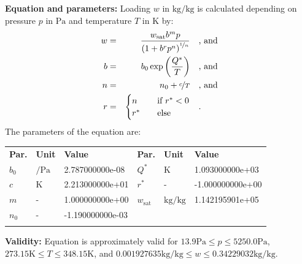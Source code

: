\textbf{Equation and parameters:}
\newline
%
Loading $w$ in $\si{\kilogram\per\kilogram}$ is calculated depending on pressure $p$ in $\si{\pascal}$ and temperature $T$ in $\si{\kelvin}$ by:
%
\begin{equation*}
\begin{split}
w &=& \frac{w_\mathrm{sat} b^{m} p}{\left( 1 + b^{r} p^{n} \right)^{\nicefrac{1}{n}}} & \quad\text{, and} \\
b &=& b_0 \exp\left( \frac{Q^{*}}{T} \right) & \quad\text{, and} \\
n &=& n_0 + \nicefrac{c}{T} & \quad\text{, and} \\
r &=& \begin{cases} n & \quad \text{if } r^{*} < 0 \\ r^{*}  & \quad \text{else} \end{cases} & \quad\text{.}
\end{split}
\end{equation*}
%
The parameters of the equation are:
%
\begin{longtable}[l]{lll|lll}
\toprule
\addlinespace
\textbf{Par.} & \textbf{Unit} & \textbf{Value} &	\textbf{Par.} & \textbf{Unit} & \textbf{Value} \\
\addlinespace
\midrule
\endhead

\bottomrule
\endfoot
\bottomrule
\endlastfoot
\addlinespace

$b_0$ & $\si{\per\pascal}$ & 2.787000000e-08 & $Q^{*}$ & $\si{\kelvin}$ & 1.093000000e+03 \\
$c$ & $\si{\kelvin}$ & 2.213000000e+01 & $r^{*}$ & - & -1.000000000e+00 \\
$m$ & - & 1.000000000e+00 & $w_\mathrm{sat}$ & $\si{\kilogram\per\kilogram}$ & 1.142195901e+05 \\
$n_0$ & - & -1.190000000e-03 & & & \\

\addlinespace\end{longtable}

\textbf{Validity:}
\newline
Equation is approximately valid for $13.9 \si{\pascal} \leq p \leq 5250.0 \si{\pascal}$,  $273.15 \si{\kelvin} \leq T \leq 348.15 \si{\kelvin}$, and $0.001927635 \si{\kilogram\per\kilogram} \leq w \leq 0.34229032 \si{\kilogram\per\kilogram}$.
\newline

